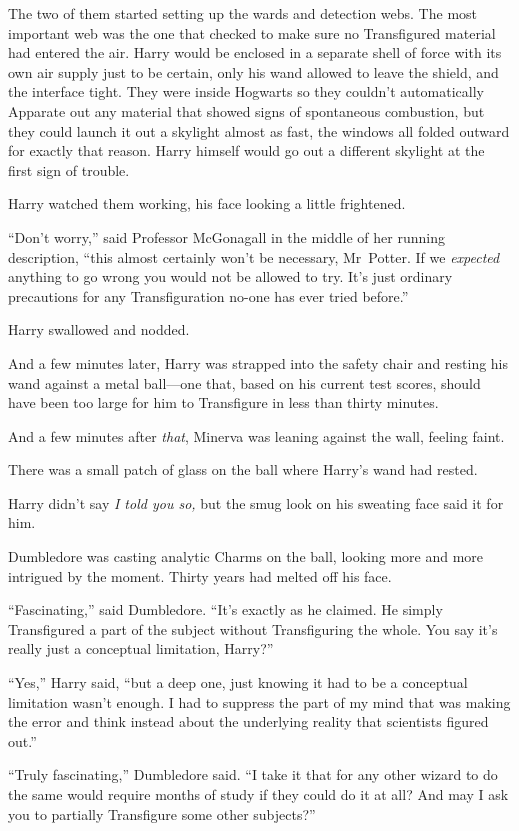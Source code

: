 The two of them started setting up the wards and detection webs. The most important web was the one that checked to make sure no Transfigured material had entered the air. Harry would be enclosed in a separate shell of force with its own air supply just to be certain, only his wand allowed to leave the shield, and the interface tight. They were inside Hogwarts so they couldn’t automatically Apparate out any material that showed signs of spontaneous combustion, but they could launch it out a skylight almost as fast, the windows all folded outward for exactly that reason. Harry himself would go out a different skylight at the first sign of trouble.

Harry watched them working, his face looking a little frightened.

“Don’t worry,” said Professor McGonagall in the middle of her running description, “this almost certainly won’t be necessary, Mr~Potter. If we \emph{expected} anything to go wrong you would not be allowed to try. It’s just ordinary precautions for any Transfiguration no-one has ever tried before.”

Harry swallowed and nodded.

And a few minutes later, Harry was strapped into the safety chair and resting his wand against a metal ball—one that, based on his current test scores, should have been too large for him to Transfigure in less than thirty minutes.

And a few minutes after \emph{that}, Minerva was leaning against the wall, feeling faint.

There was a small patch of glass on the ball where Harry’s wand had rested.

Harry didn’t say \emph{I told you so,} but the smug look on his sweating face said it for him.

Dumbledore was casting analytic Charms on the ball, looking more and more intrigued by the moment. Thirty years had melted off his face.

“Fascinating,” said Dumbledore. “It’s exactly as he claimed. He simply Transfigured a part of the subject without Transfiguring the whole. You say it’s really just a conceptual limitation, Harry?”

“Yes,” Harry said, “but a deep one, just knowing it had to be a conceptual limitation wasn’t enough. I had to suppress the part of my mind that was making the error and think instead about the underlying reality that scientists figured out.”

“Truly fascinating,” Dumbledore said. “I take it that for any other wizard to do the same would require months of study if they could do it at all? And may I ask you to partially Transfigure some other subjects?”

